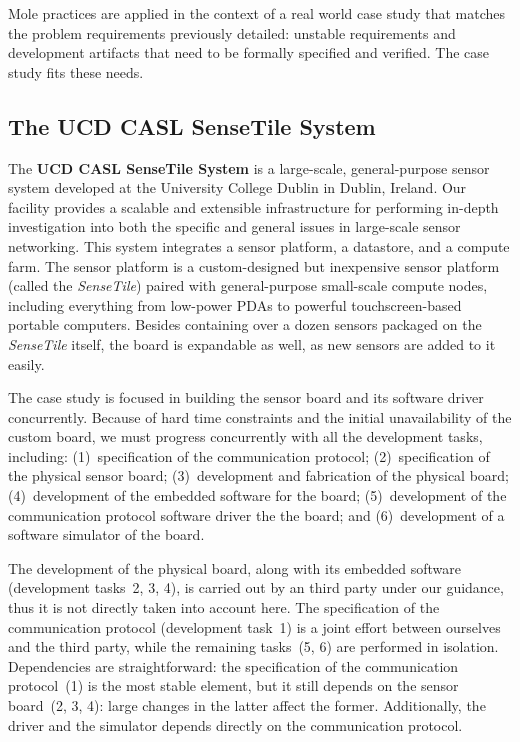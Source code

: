 \documentclass[english]{lni}
\newcommand{\ST}{\emph{SenseTile}\xspace}
\begin{document}
Mole practices are applied in the context of a real world case study
that matches the problem requirements previously detailed: unstable
requirements and development artifacts that need to be formally
specified and verified.  The case study fits these needs.

\subsection{The UCD CASL SenseTile System}
\label{sec:ucd-casl-sensetile}

The \textbf{UCD CASL SenseTile System} is a large-scale,
general-purpose sensor system developed at the University College
Dublin in Dublin, Ireland.  Our facility provides a scalable and
extensible infrastructure for performing in-depth investigation into
both the specific and general issues in large-scale sensor networking.
This system integrates a sensor platform, a datastore, and a compute
farm.  The sensor platform is a custom-designed but inexpensive sensor
platform (called the \ST) paired with general-purpose small-scale
compute nodes, including everything from low-power PDAs to powerful
touchscreen-based portable computers.  Besides containing over a dozen
sensors packaged on the \ST itself, the board is expandable as well,
as new sensors are added to it easily.

The case study is focused in building the sensor board and its
software driver concurrently.  Because of hard time constraints and
the initial unavailability of the custom board, we must progress
concurrently with all the development tasks, including:
(1)~specification of the communication protocol; (2)~specification of
the physical sensor board; (3)~development and fabrication of the
physical board; (4)~development of the embedded software for the
board; (5)~development of the communication protocol software driver
the the board; and (6)~development of a software simulator of the
board.

The development of the physical board, along with its embedded
software (development tasks~2, 3, 4), is carried out by an third party
under our guidance, thus it is not directly taken into account here.
The specification of the communication protocol (development task~1)
is a joint effort between ourselves and the third party, while the
remaining tasks~(5, 6) are performed in isolation.  Dependencies are
straightforward: the specification of the communication protocol~(1)
is the most stable element, but it still depends on the sensor
board~(2, 3, 4): large changes in the latter affect the former.
Additionally, the driver and the simulator depends directly on the
communication protocol.
\end{document}
